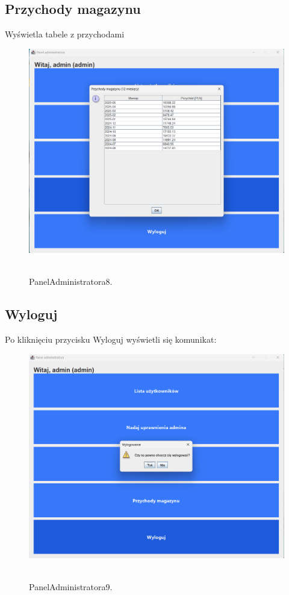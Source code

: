 \subsection{Przychody magazynu}
\label{subsec:Przychody magazynu}
Wyświetla tabele z przychodami
\begin{figure}[H]
    \centering
    \includegraphics[width=.7\linewidth]{figures/PanelAdministratora8.png}\
    \caption{PanelAdministratora8.\label{PanelAdministratora8}}
\end{figure}
\clearpage
\subsection{Wyloguj}
\label{subsec:Wyloguj}
Po kliknięciu przycisku Wyloguj wyświetli się komunikat:
\begin{figure}[H]
    \centering
    \includegraphics[width=.7\linewidth]{figures/PanelAdministratora9.png}\
    \caption{PanelAdministratora9.\label{PanelAdministratora9}}
\end{figure}